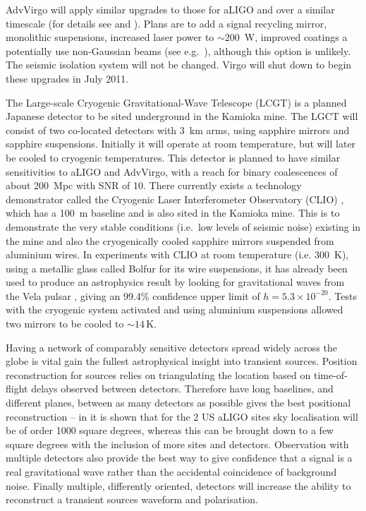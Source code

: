\documentclass{article}
\begin{document}
AdvVirgo will apply similar upgrades to those for aLIGO and over a similar
timescale (for details see \cite{AdVwhitepaper} and \cite{AdVdesign}). Plans are
to add a signal recycling mirror, monolithic suspensions, increased laser power
to $\sim200$~W, improved coatings a potentially use non-Gaussian beams (see 
e.g.~\cite{Freise:2010}), although this option is unlikely. The seismic isolation
system will not be changed. Virgo will shut down to begin these upgrades in July
2011.

The Large-scale Cryogenic Gravitational-Wave Telescope (LCGT)
\cite{Miyoki:2005, Ohashi:2008} is a planned Japanese detector to be sited
underground in the Kamioka mine. The LGCT will consist of two co-located
detectors with 3~km arms, using sapphire mirrors and sapphire
suspensions. Initially it will operate at room temperature, but will later be
cooled to cryogenic temperatures. This detector is planned to have similar sensitivities to aLIGO
and AdvVirgo, with a reach for binary coalescences of about 200~Mpc with SNR of
10. There currently exists a technology demonstrator called the Cryogenic Laser
Interferometer Observatory (CLIO) \cite{Yamamoto:2008, CLIOweb}, which has a
100~m baseline and is also sited in the Kamioka mine. This is to demonstrate the
very stable conditions (i.e.\ low levels of seismic noise) existing in the mine
and also the cryogenically cooled sapphire mirrors suspended from aluminium
wires. In experiments with CLIO at room temperature (i.e. 300~K), using a metallic glass 
called Bolfur for its wire suspensions, it has already been used to produce an astrophysics result by
looking for gravitational waves from the Vela pulsar \cite{Akutsu:2008}, giving
an 99.4\% confidence upper limit of $h = 5.3\times10^{-20}$. Tests with the
cryogenic system activated and using aluminium suspensions allowed two mirrors to be cooled to
$\sim14$\,K.

Having a network of comparably sensitive detectors spread widely across the globe 
is vital gain the fullest astrophysical insight into transient sources. Position
reconstruction for sources relies on triangulating the location based on time-of-flight
delays observed between detectors. Therefore have long baselines, and different planes,
between as many detectors as possible gives the best positional reconstruction -- in 
\cite{Fairhurst:2010} it is shown that for the 2 US aLIGO sites sky localisation will
be of order 1000 square degrees, whereas this can be brought down to a few square degrees
with the inclusion of more sites and detectors. 
Observation with multiple detectors also provide the best way to give confidence that a
signal is a real gravitational wave rather than the accidental coincidence of 
background noise. Finally multiple, differently oriented, detectors will increase the
ability to reconstruct a transient sources waveform and polarisation. 
\end{document}
